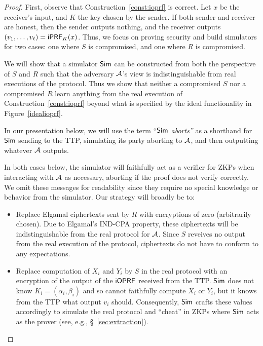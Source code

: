 \begin{proof}
  First, observe that Construction~\ref{const:ioprf} is correct. Let
  $x$ be the receiver's input, and $K$ the key chosen by the
  sender. If both sender and receiver are honest, then the sender
  outputs nothing, and the receiver outputs
  $(v_1,\ldots,v_\ell)=\mathsf{i}\mathsf{PRF}_K(x)$. Thus, we focus on proving security
  and build simulators for two cases: one where $S$ is compromised,
  and one where $R$ is compromised.

  We will show that a simulator ${\mathsf{Sim}}$ can be constructed from both
  the perspective of $S$ and $R$ such that the adversary ${\mathcal{A}}$'s view
  is indistinguishable from real executions of the protocol.  Thus we
  show that neither a compromised $S$ nor a compromised $R$ learn
  anything from the real execution of Construction~\ref{const:ioprf}
  beyond what is specified by the ideal functionality in
  Figure~\ref{idealioprf}.

  In our presentation below, we will use the term
  ``${\mathsf{Sim}}$ \emph{aborts''} as a shorthand for ${\mathsf{Sim}}$ sending \abort to
  the TTP, simulating its party aborting to ${\mathcal{A}}$, and then outputting
  whatever ${\mathcal{A}}$ outputs.

In both cases below, the simulator will faithfully act as a verifier
  for ZKPs when interacting with ${\mathcal{A}}$ as necessary, aborting if the
  proof does not verify correctly. We omit these messages for
  readability since they require no special knowledge or behavior from
  the simulator. Our strategy will broadly be to:

\begin{itemize}[leftmargin=*]
  \item Replace Elgamal ciphertexts sent by $R$ with encryptions of
  zero (arbitrarily chosen).  Due to Elgamal's IND-CPA property, these
  ciphertexts will be indistinguishable from the real protocol for
  ${\mathcal{A}}$.  Since $S$ reveives no output from the real execution of the
  protocol, ciphertexts do not have to conform to any
  expectations.

\item Replace computation of $X_i$ and $Y_i$ by $S$
  in the real protocol with an encryption of the output of the
  $\mathsf{i}\mathsf{OPRF}$ received from the TTP.  ${\mathsf{Sim}}$ does not know
  $K_i=(\alpha_i,\beta_i)$ and so cannot faithfully compute $X_i$ or
  $Y_i$, but it knows from the TTP what output $v_i$
  should. Consequently, ${\mathsf{Sim}}$ crafts these values accordingly to
  simulate the real protocol and ``cheat'' in ZKPs where ${\mathsf{Sim}}$ acts
  as the prover (see, e.g., \S~\ref{sec:extraction}).
\end{itemize}


\end{proof}
